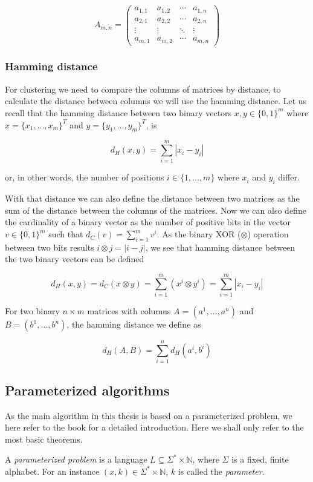 \documentclass[a4paper]{article}
\begin{document}
\[
    A_{m,n} =
    \begin{pmatrix}
        a_{1,1} & a_{1,2} & \cdots & a_{1,n} \\
        a_{2,1} & a_{2,2} & \cdots & a_{2,n} \\
        \vdots  & \vdots  & \ddots & \vdots  \\
        a_{m,1} & a_{m,2} & \cdots & a_{m,n}
    \end{pmatrix}
\]

\subsubsection{Hamming distance}
For clustering we need to compare the columns of matrices by distance, to calculate the distance
between columns we will use the hamming distance. Let us recall that the hamming distance
between two binary vectors $x,y \in \{0,1\}^m$ where $x=\{x_1,...,x_m\}^T$ and
$y=\{y_1,...,y_m\}^T$, is

\[
    d_H(x,y)= \sum_{i = 1}^{m} |x_i - y_i|
\]

or, in other words, the number of positions $i \in \{1,...,m\}$ where $x_i$ and $y_i$ differ.

With that distance we can
also define the distance between two matrices as the sum of the distance between the columns of
the matrices. Now we can also define the cardinality of a binary vector as the number of positive bits in
the vector $v \in \{0,1\}^m$ such that $d_C(v)=\sum_{i = 1}^{m} v^i$. As the binary XOR ($\otimes$)
operation between two bits results $i \otimes j = |i - j|$, we see that hamming distance between
the two binary vectors can be defined

\[
    d_H(x, y) = d_C(x \otimes y) =\sum_{i = 1}^{m} (x^i \otimes y^i) = \sum_{i = 1}^{m} |x_i - y_i|
\]

For two binary $n \times m$ matrices with columns $A=(a^1,...,a^n)$ and
$B=(b^1,...,b^n)$, the hamming distance we define as

\[
    d_H(A,B) = \sum_{i = 1}^{n} d_H(a^i, b^i)
\]

\subsection{Parameterized algorithms}
As the main algorithm in this thesis is based on a parameterized problem, we here refer to the
book \cite{param_algo_book} for a detailed introduction. Here we shall only refer to the most
basic theorems.

\begin{theoremdefinition}
    A \textit{parameterized problem} is a language $L \subseteq \Sigma^* \times \mathbb{N}$,
    where $\Sigma$ is a fixed, finite alphabet. For an instance $(x,k) \in \Sigma^* \times \mathbb{N}$,
    $k$ is called the \textit{parameter}. \cite[p.~12]{param_algo_book}
\end{theoremdefinition}
\end{document}
